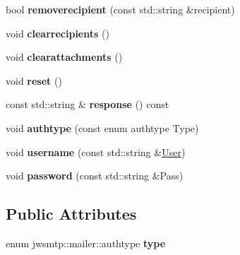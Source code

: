 \begin{DoxyCompactItemize}
\item 
\hypertarget{classjwsmtp_1_1mailer_aaf08ac5f9cfe7b2c2491cf9bd86dd2dc}{bool {\bfseries removerecipient} (const std\-::string \&recipient)}\label{classjwsmtp_1_1mailer_aaf08ac5f9cfe7b2c2491cf9bd86dd2dc}

\item 
\hypertarget{classjwsmtp_1_1mailer_abe98321f7402147da6d43726b7f0b72c}{void {\bfseries clearrecipients} ()}\label{classjwsmtp_1_1mailer_abe98321f7402147da6d43726b7f0b72c}

\item 
\hypertarget{classjwsmtp_1_1mailer_a77d2b39ec4855a741ac0156e242d5224}{void {\bfseries clearattachments} ()}\label{classjwsmtp_1_1mailer_a77d2b39ec4855a741ac0156e242d5224}

\item 
\hypertarget{classjwsmtp_1_1mailer_a4bf4b663e343bad40f658cef48f78521}{void {\bfseries reset} ()}\label{classjwsmtp_1_1mailer_a4bf4b663e343bad40f658cef48f78521}

\item 
\hypertarget{classjwsmtp_1_1mailer_a862d80a5c66fac98d254745fde7b1fb8}{const std\-::string \& {\bfseries response} () const }\label{classjwsmtp_1_1mailer_a862d80a5c66fac98d254745fde7b1fb8}

\item 
\hypertarget{classjwsmtp_1_1mailer_a13e354584e6b389b53db283105e1d995}{void {\bfseries authtype} (const enum authtype Type)}\label{classjwsmtp_1_1mailer_a13e354584e6b389b53db283105e1d995}

\item 
\hypertarget{classjwsmtp_1_1mailer_a8f43636be8ea428371915b611c508fc3}{void {\bfseries username} (const std\-::string \&\hyperlink{classUser}{User})}\label{classjwsmtp_1_1mailer_a8f43636be8ea428371915b611c508fc3}

\item 
\hypertarget{classjwsmtp_1_1mailer_ab0d3608eefc489f80c145530f45e1c49}{void {\bfseries password} (const std\-::string \&Pass)}\label{classjwsmtp_1_1mailer_ab0d3608eefc489f80c145530f45e1c49}

\end{DoxyCompactItemize}
\subsection*{Public Attributes}
\begin{DoxyCompactItemize}
\item 
\hypertarget{classjwsmtp_1_1mailer_a34be8c1b0f30f2e794629a463450df4e}{enum jwsmtp\-::mailer\-::authtype {\bfseries type}}\label{classjwsmtp_1_1mailer_a34be8c1b0f30f2e794629a463450df4e}

\end{DoxyCompactItemize}
